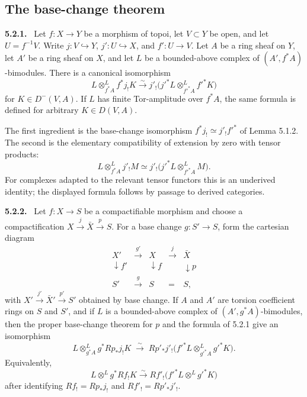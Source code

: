 \documentclass[12pt]{article}
\newenvironment{statement}[1]{\par\medskip\noindent\textbf{#1.}\ }{\par\medskip}
\begin{document}
\subsection{The base-change theorem}

\begin{statement}{5.2.1}
Let \(f:X\to Y\) be a morphism of topoi, let \(V\subset Y\) be open, and let \(U=f^{-1}V\). Write \(j:V\hookrightarrow Y\), \(j':U\hookrightarrow X\), and \(f':U\to V\). Let \(A\) be a ring sheaf on \(Y\), let \(A'\) be a ring sheaf on \(X\), and let \(L\) be a bounded-above complex of \((A',f^*A)\)-bimodules. There is a canonical isomorphism
\[
L\otimes^L_{f^*A} f^*j_!K
 \xrightarrow{\sim}
 j'_!\bigl(j'^*L\otimes^L_{f'^*A}f'^*K\bigr)
\]
for \(K\in D^-(V,A)\). If \(L\) has finite Tor-amplitude over \(f^*A\), the same formula is defined for arbitrary \(K\in D(V,A)\).
\end{statement}

The first ingredient is the base-change isomorphism \(f^*j_!\simeq j'_!f'^*\) of Lemma 5.1.2. The second is the elementary compatibility of extension by zero with tensor products:
\[
L\otimes^L_{f^*A}j'_!M
 \simeq
j'_!\bigl(j'^*L\otimes^L_{f'^*A}M\bigr).
\]
For complexes adapted to the relevant tensor functors this is an underived identity; the displayed formula follows by passage to derived categories.

\begin{statement}{5.2.2}
Let \(f:X\to S\) be a compactifiable morphism and choose a compactification \(X\xrightarrow{j}\bar X\xrightarrow{p}S\). For a base change \(g:S'\to S\), form the cartesian diagram
\[
\begin{array}{ccccc}
X'&\xrightarrow{g'}&X&\xrightarrow{j}&\bar X\\
\downarrow f'&&\downarrow f&&\downarrow p\\
S'&\xrightarrow{g}&S&=&S,
\end{array}
\]
with \(X'\xrightarrow{j'}\bar X'\xrightarrow{p'}S'\) obtained by base change. If \(A\) and \(A'\) are torsion coefficient rings on \(S\) and \(S'\), and if \(L\) is a bounded-above complex of \((A',g^*A)\)-bimodules, then the proper base-change theorem for \(p\) and the formula of 5.2.1 give an isomorphism
\[
L\otimes^L_{g^*A}g^*Rp_*j_!K
\;\xrightarrow{\sim}\;
Rp'_*j'_!\bigl(f'^*L\otimes^L_{g'^*A}g'^*K\bigr).
\]
Equivalently,
\[
L\otimes^L g^*Rf_!K\xrightarrow{\sim}Rf'_!\bigl(f'^*L\otimes^Lg'^*K\bigr)
\]
after identifying \(Rf_!=Rp_*j_!\) and \(Rf'_!=Rp'_*j'_!\).
\end{statement}
\end{document}
